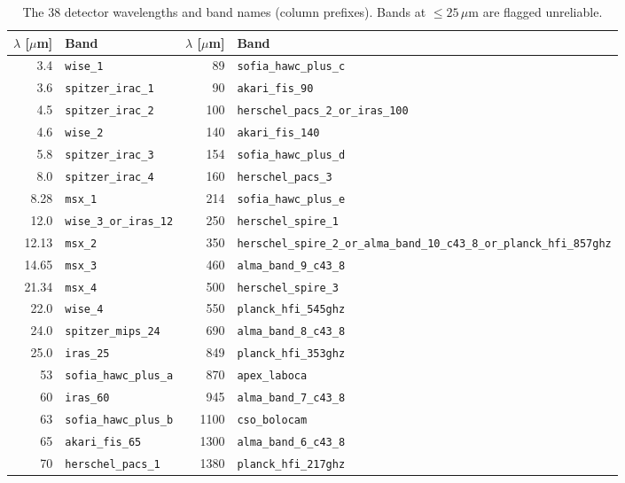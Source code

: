\begin{table}[ht]
  \centering
  \caption{The 38 detector wavelengths and band names (column prefixes). Bands at $\le25\,\mu\mathrm{m}$ are
  flagged unreliable.}
  \label{tab:bands}
  \footnotesize
  \begin{tabular}{@{}rl rl@{}}
    \toprule
    $\lambda$ [$\mu$m] & Band & $\lambda$ [$\mu$m] & Band \\
    \midrule
    3.4   & \texttt{wise\_1}            & 89    & \texttt{sofia\_hawc\_plus\_c} \\
    3.6   & \texttt{spitzer\_irac\_1}   & 90    & \texttt{akari\_fis\_90} \\
    4.5   & \texttt{spitzer\_irac\_2}   & 100   & \texttt{herschel\_pacs\_2\_or\_iras\_100} \\
    4.6   & \texttt{wise\_2}            & 140   & \texttt{akari\_fis\_140} \\
    5.8   & \texttt{spitzer\_irac\_3}   & 154   & \texttt{sofia\_hawc\_plus\_d} \\
    8.0   & \texttt{spitzer\_irac\_4}   & 160   & \texttt{herschel\_pacs\_3} \\
    8.28  & \texttt{msx\_1}             & 214   & \texttt{sofia\_hawc\_plus\_e} \\
    12.0  & \texttt{wise\_3\_or\_iras\_12} & 250 & \texttt{herschel\_spire\_1} \\
    12.13 & \texttt{msx\_2}             & 350   & \texttt{herschel\_spire\_2\_or\_alma\_band\_10\_c43\_8\_or\_planck\_hfi\_857ghz} \\
    14.65 & \texttt{msx\_3}             & 460   & \texttt{alma\_band\_9\_c43\_8} \\
    21.34 & \texttt{msx\_4}             & 500   & \texttt{herschel\_spire\_3} \\
    22.0  & \texttt{wise\_4}            & 550   & \texttt{planck\_hfi\_545ghz} \\
    24.0  & \texttt{spitzer\_mips\_24}  & 690   & \texttt{alma\_band\_8\_c43\_8} \\
    25.0  & \texttt{iras\_25}           & 849   & \texttt{planck\_hfi\_353ghz} \\
    53    & \texttt{sofia\_hawc\_plus\_a} & 870 & \texttt{apex\_laboca} \\
    60    & \texttt{iras\_60}           & 945   & \texttt{alma\_band\_7\_c43\_8} \\
    63    & \texttt{sofia\_hawc\_plus\_b} & 1100 & \texttt{cso\_bolocam} \\
    65    & \texttt{akari\_fis\_65}     & 1300  & \texttt{alma\_band\_6\_c43\_8} \\
    70    & \texttt{herschel\_pacs\_1}  & 1380  & \texttt{planck\_hfi\_217ghz} \\
    \bottomrule
  \end{tabular}
\end{table}

